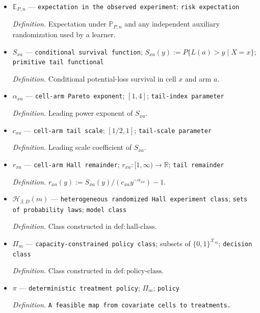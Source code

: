 \documentclass{article}
\begin{document}
\begin{itemize}
  \par\smallskip\noindent\emph{Definition.} \(\mathbb P_{P,n}:=\{P\circ(X,A,L)^{-1}\}^{\otimes n}\), the \(n\)-fold product of the observed marginal of the fixed-\(m\) one-record law \(P\).
  \item \(\mathbb E_{P,n}\) --- \texttt{expectation in the observed experiment}; \texttt{risk expectation}
  \par\smallskip\noindent\emph{Definition.} Expectation under \(\mathbb P_{P,n}\) and any independent auxiliary randomization used by a learner.
  \item \(S_{xa}\) --- \texttt{conditional survival function}; \(S_{xa}(y):=P\{L(a)>y\mid X=x\}\); \texttt{primitive tail functional}
  \par\smallskip\noindent\emph{Definition.} Conditional potential-loss survival in cell \(x\) and arm \(a\).
  \item \(\alpha_{xa}\) --- \texttt{cell-\allowbreak{}arm Pareto exponent}; \([1,4]\); \texttt{tail-\allowbreak{}index parameter}
  \par\smallskip\noindent\emph{Definition.} Leading power exponent of \(S_{xa}\).
  \item \(c_{xa}\) --- \texttt{cell-\allowbreak{}arm tail scale}; \([1/2,1]\); \texttt{tail-\allowbreak{}scale parameter}
  \par\smallskip\noindent\emph{Definition.} Leading scale coefficient of \(S_{xa}\).
  \item \(r_{xa}\) --- \texttt{cell-\allowbreak{}arm Hall remainder}; \(r_{xa}:[1,\infty)\to\mathbb R\); \texttt{tail remainder}
  \par\smallskip\noindent\emph{Definition.} \(r_{xa}(y):=S_{xa}(y)/(c_{xa}y^{-\alpha_{xa}})-1\).
  \item \(\mathcal H_{\beta,D}(m)\) --- \texttt{heterogeneous randomized Hall experiment class}; \texttt{sets of probability laws}; \texttt{model class}
  \par\smallskip\noindent\emph{Definition.} Class constructed in \(\mathrm{def{:}hall\text{-}class}\).
  \item \(\Pi_m\) --- \texttt{capacity-\allowbreak{}constrained policy class}; subsets of \(\{0,1\}^{\mathcal X_m}\); \texttt{decision class}
  \par\smallskip\noindent\emph{Definition.} Class constructed in \(\mathrm{def{:}policy\text{-}class}\).
  \item \(\pi\) --- \texttt{deterministic treatment policy}; \(\Pi_m\); \texttt{policy}
  \par\smallskip\noindent\emph{Definition.} \texttt{A feasible map from covariate cells to treatments.}

\end{itemize}
\end{document}
